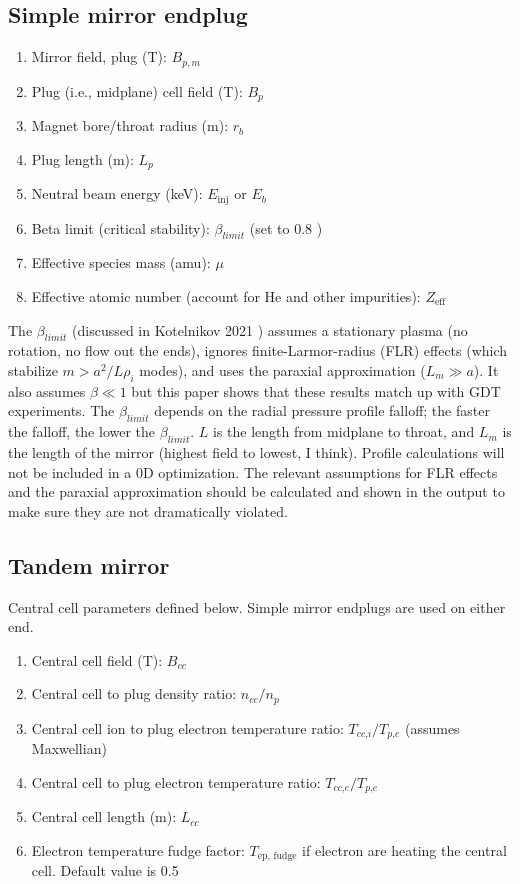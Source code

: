 \subsection{Simple mirror endplug}

\begin{enumerate}
    \item Mirror field, plug (T): $B_{p, m}$
    \item Plug (i.e., midplane) cell field (T): $B_p$
    \item Magnet bore/throat radius (m): $r_b$
    \item Plug length (m): $L_p$
    \item Neutral beam energy (keV): $E_{\text{inj}}$ or $E_b$
    \item Beta limit (critical stability): $\beta_{limit}$ (set to 0.8 \cite{KOTELNIKOV_2021})
    \item Effective species mass (amu): $\mu$
    \item Effective atomic number (account for He and other impurities): $Z_{\text{eff}}$
\end{enumerate}

The $\beta_{limit}$ (discussed in Kotelnikov 2021 \cite{KOTELNIKOV_2021}) assumes a stationary plasma (no rotation, no flow out the ends), ignores finite-Larmor-radius (FLR) effects (which stabilize $m > a^2/L \rho_i$ modes), and uses the paraxial approximation ($L_m \gg a$). It also assumes $\beta \ll 1$ but this paper shows that these results match up with GDT experiments. The $\beta_{limit}$ depends on the radial pressure profile falloff; the faster the falloff, the lower the $\beta_{limit}$. $L$ is the length from midplane to throat, and $L_m$ is the length of the mirror (highest field to lowest, I think). Profile calculations will not be included in a 0D optimization. The relevant assumptions for FLR effects and the paraxial approximation should be calculated and shown in the output to make sure they are not dramatically violated.

\subsection{Tandem mirror}

Central cell parameters defined below. Simple mirror endplugs are used on either end.

\begin{enumerate}
    \item Central cell field (T): $B_{cc}$
    \item Central cell to plug density ratio: $n_{\textit{cc}}/n_p$
    \item Central cell ion to plug electron temperature ratio: $T_{\textit{cc,i}}/T_\textit{p,e}$ (assumes Maxwellian)
    \item Central cell to plug electron temperature ratio: $T_{\textit{cc,e}}/T_\textit{p,e}$
    \item Central cell length (m): $L_{cc}$
    \item Electron temperature fudge factor: $T_{\text{ep, fudge}}$ if electron are heating the central cell. Default value is 0.5
\end{enumerate}


